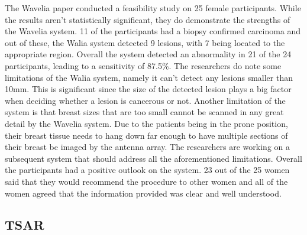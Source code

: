 \noindent The Wavelia paper \cite{moloneyWaveliaMicrowaveBreast2021} conducted a feasibility study on 25 female
participants. While the results aren't statistically significant, they do demonstrate the strengths of the Wavelia
system. 11 of the participants had a biopsy confirmed carcinoma and out of these, the Walia system detected 9 lesions,
with 7 being located to the appropriate region. Overall the system detected an abnormality in 21 of the 24 participants,
leading to a sensitivity of 87.5\%. The researchers do note some limitations of the Walia system, namely it can't detect
any lesions smaller than 10mm. This is significant since the size of the detected lesion plays a big factor when
deciding whether a lesion is cancerous or not. Another limitation of the system is that breast sizes that are too small
cannot be scanned in any great detail by the Wavelia system. Due to the patients being in the prone position, their
breast tissue needs to hang down far enough to have multiple sections of their breast be imaged by the antenna array.
The researchers are working on a subsequent system that should address all the aforementioned limitations. Overall the
participants had a positive outlook on the system. 23 out of the 25 women said that they would recommend the procedure
to other women and all of the women agreed that the information provided was clear and well understood.

\subsection{TSAR}